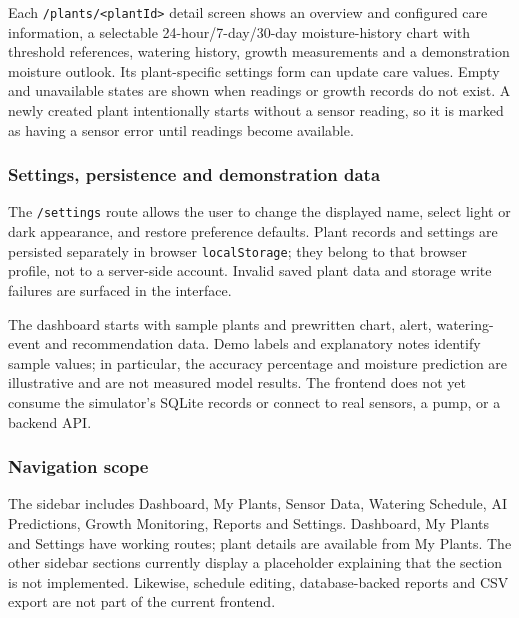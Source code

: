 \documentclass[11pt,a4paper]{article}
\newcommand{\cn}[1]{\texttt{#1}}   %
\begin{document}
Each \cn{/plants/<plantId>} detail screen shows an overview and configured
care information, a selectable 24-hour/7-day/30-day moisture-history chart
with threshold references, watering history, growth measurements and a
demonstration moisture outlook. Its plant-specific settings form can update
care values. Empty and unavailable states are shown when readings or growth
records do not exist. A newly created plant intentionally starts without a
sensor reading, so it is marked as having a sensor error until readings
become available.

\subsubsection{Settings, persistence and demonstration data}
The \cn{/settings} route allows the user to change the displayed name, select
light or dark appearance, and restore preference defaults. Plant records and
settings are persisted separately in browser \cn{localStorage}; they belong
to that browser profile, not to a server-side account. Invalid saved plant
data and storage write failures are surfaced in the interface.

The dashboard starts with sample plants and prewritten chart, alert,
watering-event and recommendation data. Demo labels and explanatory notes
identify sample values; in particular, the accuracy percentage and moisture
prediction are illustrative and are not measured model results. The frontend
does not yet consume the simulator's SQLite records or connect to real
sensors, a pump, or a backend API.

\subsubsection{Navigation scope}
The sidebar includes Dashboard, My Plants, Sensor Data, Watering Schedule,
AI Predictions, Growth Monitoring, Reports and Settings. Dashboard, My Plants
and Settings have working routes; plant details are available from My Plants.
The other sidebar sections currently display a placeholder explaining that
the section is not implemented. Likewise, schedule editing, database-backed
reports and CSV export are not part of the current frontend.
\end{document}
